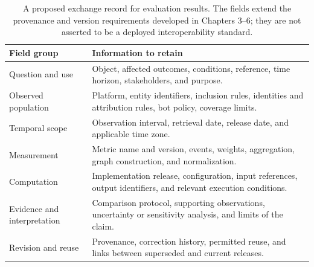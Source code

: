 \begin{table}[tbp]
\caption{A proposed exchange record for evaluation results. The fields extend the provenance and version requirements developed in Chapters 3--6; they are not asserted to be a deployed interoperability standard.}
\label{tab:ch11-record}
\centering\small\renewcommand{\arraystretch}{1.15}
\begin{tabularx}{\linewidth}{@{}>{\raggedright\arraybackslash}p{.24\linewidth}>{\raggedright\arraybackslash}X@{}}
\toprule
\textbf{Field group} & \textbf{Information to retain}\\\midrule
Question and use & Object, affected outcomes, conditions, reference, time horizon, stakeholders, and purpose.\\[3pt]
Observed population & Platform, entity identifiers, inclusion rules, identities and attribution rules, bot policy, coverage limits.\\[3pt]
Temporal scope & Observation interval, retrieval date, release date, and applicable time zone.\\[3pt]
Measurement & Metric name and version, events, weights, aggregation, graph construction, and normalization.\\[3pt]
Computation & Implementation release, configuration, input references, output identifiers, and relevant execution conditions.\\[3pt]
Evidence and interpretation & Comparison protocol, supporting observations, uncertainty or sensitivity analysis, and limits of the claim.\\[3pt]
Revision and reuse & Provenance, correction history, permitted reuse, and links between superseded and current releases.\\
\bottomrule
\end{tabularx}
\end{table}
